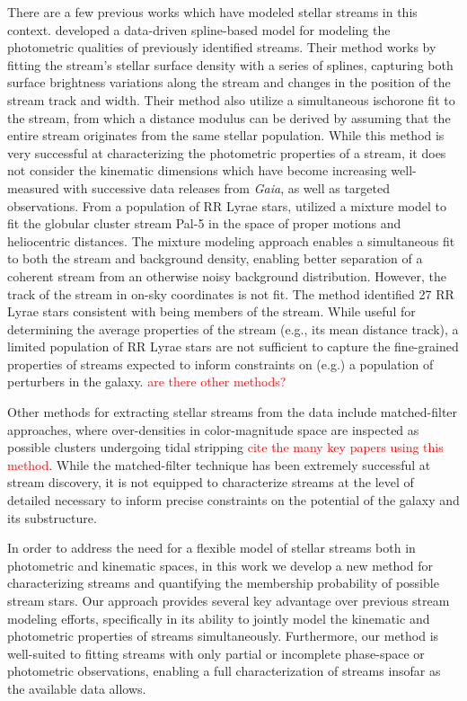 \documentclass[twocolumn]{aastex631}
\newcommand{\TODO}[1]{{\textcolor{red}{#1}}}
\newcommand{\JN}[1]{\TODO{#1}}
\begin{document}
    There are a few previous works which have modeled stellar streams in this context. \citet{2022MNRAS.514.1757P} developed a data-driven spline-based model for modeling the photometric qualities of previously identified streams. Their method works by fitting the stream's stellar surface density with a series of splines, capturing both surface brightness variations along the stream and changes in the position of the stream track and width. Their method also utilize a simultaneous ischorone fit to the stream, from which a distance modulus can be derived by assuming that the entire stream originates from the same stellar population. While this method is very successful at characterizing the photometric properties of a stream, it does not consider the kinematic dimensions which have become increasing well-measured with successive data releases from {\it Gaia}, as well as targeted observations. From a population of RR Lyrae stars, \citet{2019AJ....158..223P} utilized a mixture model to fit the globular cluster stream Pal-5 in the space of proper motions and heliocentric distances. The mixture modeling approach enables a simultaneous fit to both the stream and background density, enabling better separation of a coherent stream from an otherwise noisy background distribution. However, the track of the stream in on-sky coordinates is not fit. The method identified 27 RR Lyrae stars consistent with being members of the stream. While useful for determining the average properties of the stream (e.g., its mean distance track), a limited population of RR Lyrae stars are not sufficient to capture the fine-grained properties of streams expected to inform constraints on (e.g.) a population of perturbers in the galaxy. \JN{are there other methods?}


    Other methods for extracting stellar streams from the data include matched-filter approaches, where over-densities in color-magnitude space are inspected as possible clusters undergoing tidal stripping \JN{cite the many key papers using this method}. While the matched-filter technique has been extremely successful at stream discovery, it is not equipped to characterize streams at the level of detailed necessary to inform precise constraints on the potential of the galaxy and its substructure.

    In order to address the need for a flexible model of stellar streams both in photometric and kinematic spaces, in this work we develop a new method for characterizing streams and quantifying the membership probability of possible stream stars. Our approach provides several key advantage over previous stream modeling efforts, specifically in its ability to jointly model the kinematic and photometric properties of streams simultaneously. Furthermore, our method is well-suited to fitting streams with only partial or incomplete phase-space or photometric observations, enabling a full characterization of streams insofar as the available data allows. 
\end{document}
